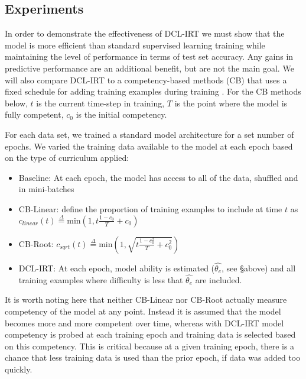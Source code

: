 \documentclass[letterpaper]{article} %
\begin{document}
\subsection{Experiments} 

In order to demonstrate the effectiveness of DCL-IRT we must show that the model is more efficient than standard supervised learning training while maintaining the level of performance in terms of test set accuracy. 
Any gains in predictive performance are an additional benefit, but are not the main goal.
We will also compare DCL-IRT to a competency-based methods (CB) that uses a fixed schedule for adding training examples during training \cite{platanios_competence-based_2019}.
For the CB methods below, $t$ is the current time-step in training, $T$ is the point where the model is fully competent, $c_0$ is the initial competency. 

For each data set, we trained a standard model architecture for a set number of epochs. 
We varied the training data available to the model at each epoch based on the type of curriculum applied:

\begin{itemize}
	\item 
	Baseline: At each epoch, the model has access to all of the data, shuffled and in mini-batches
	\item 
	CB-Linear: define the proportion of training examples to include at time $t$ as $c_{linear}(t) \overset{\Delta}{=} \text{min} (1, t\frac{1-c_0}{T} + c_0)$
	\item 
	CB-Root: $c_{sqrt}(t) \overset{\Delta}{=} \text{min}(1, \sqrt{t\frac{1-c_0^2}{T} + c_0^2})$
	\item 
	DCL-IRT: At each epoch, model ability is estimated ($\hat{\theta_e}$, see \S above) and all training examples where difficulty is less that $\hat{\theta_e}$ are included.
\end{itemize}

It is worth noting here that neither CB-Linear nor CB-Root actually measure competency of the model at any point. 
Instead it is assumed that the model becomes more and more competent over time, whereas with DCL-IRT model competency is probed at each training epoch and training data is selected based on this competency.
This is critical because at a given training epoch, there is a chance that less training data is used than the prior epoch, if data was added too quickly.
\end{document}
